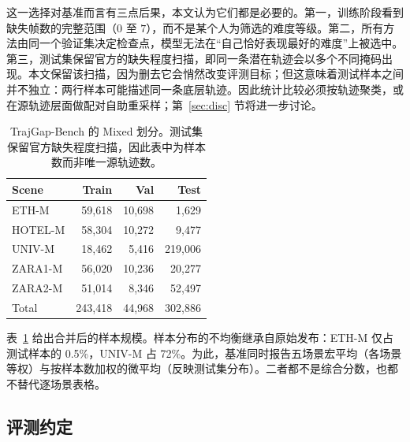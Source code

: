 这一选择对基准而言有三点后果，本文认为它们都是必要的。第一，训练阶段看到缺失帧数的完整范围（$0$ 至 $7$），而不是某个人为筛选的难度等级。第二，所有方法由同一个验证集决定检查点，模型无法在“自己恰好表现最好的难度”上被选中。第三，测试集保留官方的缺失程度扫描，即同一条潜在轨迹会以多个不同掩码出现。本文保留该扫描，因为删去它会悄然改变评测目标；但这意味着测试样本之间并不独立：两行样本可能描述同一条底层轨迹。因此统计比较必须按轨迹聚类，或在源轨迹层面做配对自助重采样；第~\ref{sec:disc} 节将进一步讨论。

\begin{table}[t]
\centering
\small
\caption{TrajGap-Bench 的 Mixed 划分。测试集保留官方缺失程度扫描，因此表中为样本数而非唯一源轨迹数。}
\label{tab:data}
\begin{tabular}{@{}lrrr@{}}
\toprule
Scene & Train & Val & Test \\
\midrule
ETH-M   & 59{,}618 & 10{,}698 & 1{,}629 \\
HOTEL-M & 58{,}304 & 10{,}272 & 9{,}477 \\
UNIV-M  & 18{,}462 & 5{,}416  & 219{,}006 \\
ZARA1-M & 56{,}020 & 10{,}236 & 20{,}277 \\
ZARA2-M & 51{,}014 & 8{,}346  & 52{,}497 \\
\midrule
Total   & 243{,}418 & 44{,}968 & 302{,}886 \\
\bottomrule
\end{tabular}
\end{table}

表~\ref{tab:data} 给出合并后的样本规模。样本分布的不均衡继承自原始发布：ETH-M 仅占测试样本的 0.5\%，UNIV-M 占 72\%。为此，基准同时报告五场景宏平均（各场景等权）与按样本数加权的微平均（反映测试集分布）。二者都不是综合分数，也都不替代逐场景表格。

\subsection{评测约定}
\label{sec:contract}

